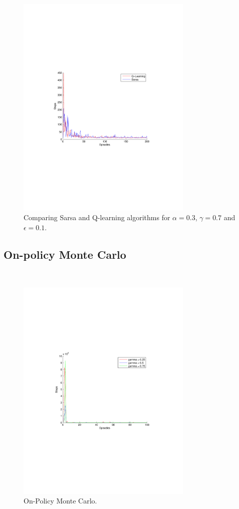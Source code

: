 \documentclass[a4paper,11pt]{article}
\begin{document}
\begin{figure}[t!]
  \centering
    \includegraphics[trim=4cm 8.5cm 4cm 8.5cm,clip,width=0.75\textwidth]{figures/sarsaQcomp03.pdf}
    \caption{Comparing Sarsa and Q-learning algorithms for $\alpha = 0.3$, $\gamma = 0.7$ and $\epsilon = 0.1$.}
\end{figure}



\subsection*{On-policy Monte Carlo}
~
\begin{figure}[t!]
  \centering
    \includegraphics[trim=4cm 8.5cm 4cm 8.5cm,clip,width=0.75\textwidth]{figures/onmc.pdf}
    \caption{On-Policy Monte Carlo.}
\end{figure}
\end{document}
